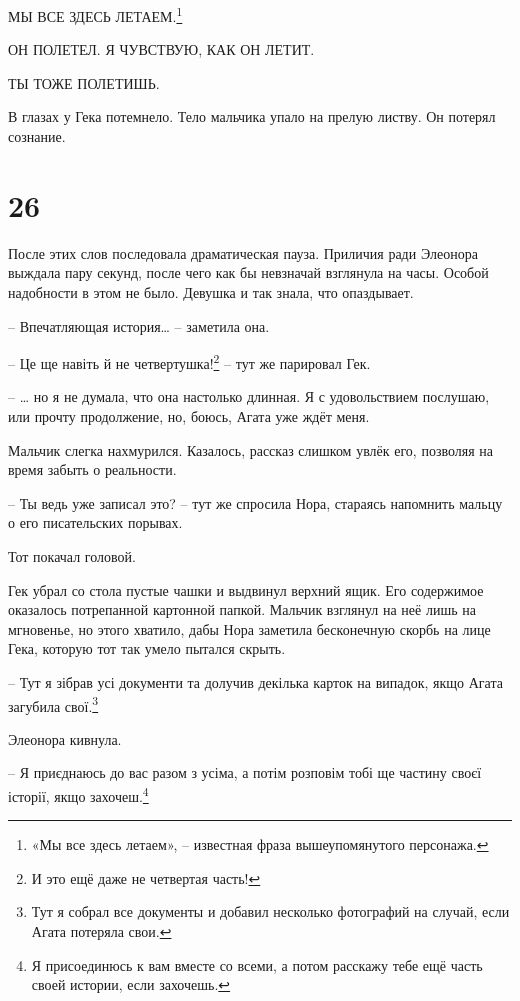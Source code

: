 \documentclass[
  a5paperpaper,
  DIV=11,
  numbers=noendperiod]{scrreprt}
\begin{document}
МЫ ВСЕ ЗДЕСЬ ЛЕТАЕМ.\footnote{«Мы все здесь летаем», -- известная фраза
  вышеупомянутого персонажа.}

ОН ПОЛЕТЕЛ. Я ЧУВСТВУЮ, КАК ОН ЛЕТИТ.

ТЫ ТОЖЕ ПОЛЕТИШЬ.

В глазах у Гека потемнело. Тело мальчика упало на прелую листву. Он
потерял сознание.

\section*{26}\label{26}


После этих слов последовала драматическая пауза. Приличия ради Элеонора
выждала пару секунд, после чего как бы невзначай взглянула на часы.
Особой надобности в этом не было. Девушка и так знала, что опаздывает.

-- Впечатляющая история\ldots{} -- заметила она.

-- Це ще навіть й не четвертушка!\footnote{И это ещё даже не четвертая
  часть!} -- тут же парировал Гек.

-- \ldots{} но я не думала, что она настолько длинная. Я с удовольствием
послушаю, или прочту продолжение, но, боюсь, Агата уже ждёт меня.

Мальчик слегка нахмурился. Казалось, рассказ слишком увлёк его, позволяя
на время забыть о реальности.

-- Ты ведь уже записал это? -- тут же спросила Нора, стараясь напомнить
мальцу о его писательских порывах.

Тот покачал головой.

Гек убрал со стола пустые чашки и выдвинул верхний ящик. Его содержимое
оказалось потрепанной картонной папкой. Мальчик взглянул на неё лишь на
мгновенье, но этого хватило, дабы Нора заметила бесконечную скорбь на
лице Гека, которую тот так умело пытался скрыть.

-- Тут я зібрав усі документи та долучив декілька карток на випадок,
якщо Агата загубила свої.\footnote{Тут я собрал все документы и добавил
  несколько фотографий на случай, если Агата потеряла свои.}

Элеонора кивнула.

-- Я приєднаюсь до вас разом з усіма, а потім розповім тобі ще частину
своєї історії, якщо захочеш.\footnote{Я присоединюсь к вам вместе со
  всеми, а потом расскажу тебе ещё часть своей истории, если захочешь.}
\end{document}
